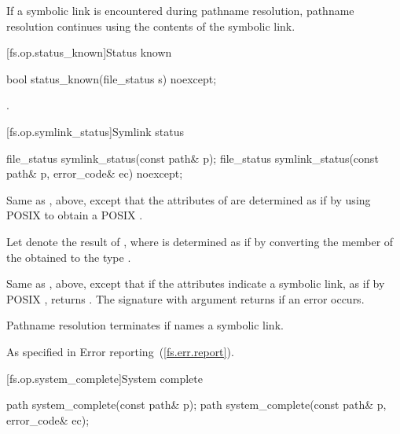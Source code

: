 \begin{itemdescr}
\pnum
\remarks If a symbolic link is encountered during pathname resolution,
      pathname resolution continues using the contents of the symbolic link.
\end{itemdescr}


[fs.op.status_known]{Status known}

\begin{itemdecl}
bool status_known(file_status s) noexcept;
\end{itemdecl}

\begin{itemdescr}
\pnum
\returns {}.
\end{itemdescr}


[fs.op.symlink_status]{Symlink status}

\begin{itemdecl}
file_status symlink_status(const path& p);
file_status symlink_status(const path& p, error_code& ec) noexcept;
\end{itemdecl}

\begin{itemdescr}
\pnum
\effects Same as , above,
  except that the attributes
    of  are determined as if by using POSIX 
    to obtain a POSIX .

\pnum
Let  denote the result of ,
where  is determined as if by converting the  member
of the obtained  to the type .

\pnum
\returns Same as , above, except
      that if the attributes indicate a symbolic link, as if by POSIX ,
      returns .
      The signature with argument  returns
       if an error occurs.

\pnum
\remarks Pathname resolution terminates if  names a symbolic link.

\pnum
\throws As specified in Error reporting~(\ref{fs.err.report}).
\end{itemdescr}


[fs.op.system_complete]{System complete}

\begin{itemdecl}
path system_complete(const path& p);
path system_complete(const path& p, error_code& ec);
\end{itemdecl}

